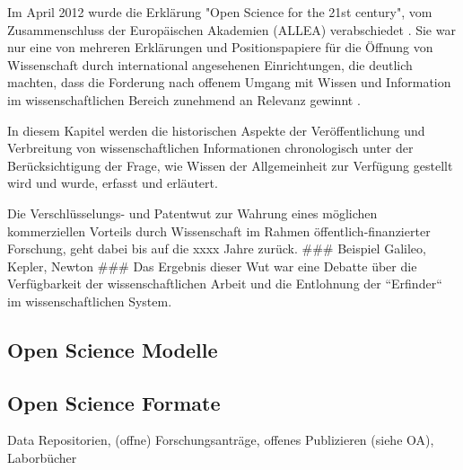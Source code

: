 Im April 2012 wurde die Erklärung "Open Science for the 21st century", vom Zusammenschluss der Europäischen Akademien (ALLEA) verabschiedet \cite{ALLEA_2012}. Sie war nur eine von mehreren Erklärungen und Positionspapiere für die Öffnung von Wissenschaft durch international angesehenen Einrichtungen, die deutlich machten, dass die Forderung nach offenem Umgang mit Wissen und Information im wissenschaftlichen Bereich zunehmend an Relevanz gewinnt \cite{schulze_2013_open}.

In diesem Kapitel werden die historischen Aspekte der Veröffentlichung und Verbreitung von wissenschaftlichen Informationen chronologisch unter der Berücksichtigung der Frage, wie Wissen der Allgemeinheit zur Verfügung gestellt wird und wurde, erfasst und erläutert. 

Die Verschlüsselungs- und Patentwut zur Wahrung eines möglichen kommerziellen Vorteils durch Wissenschaft im Rahmen öffentlich-finanzierter Forschung, geht dabei bis auf die xxxx Jahre zurück. ### Beispiel Galileo, Kepler, Newton ### Das Ergebnis dieser Wut war eine Debatte über die Verfügbarkeit der wissenschaftlichen Arbeit und die Entlohnung der “Erfinder“ im wissenschaftlichen System. 
\subsection{Open Science Modelle}
\subsection{Open Science Formate}
Data Repositorien, (offne) Forschungsanträge, offenes Publizieren (siehe OA), Laborbücher

